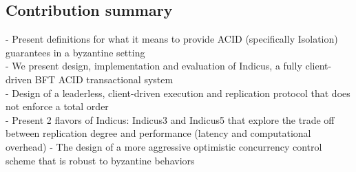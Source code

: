\subsection{Contribution summary}
 - Present definitions for what it means to provide ACID (specifically Isolation) guarantees in a byzantine setting\\
 - We present design, implementation and evaluation of Indicus, a fully client-driven BFT ACID transactional system \\
 - Design of a leaderless, client-driven execution and replication protocol that does not enforce a total order\\
 - Present 2 flavors of Indicus: Indicus3 and Indicus5 that explore the trade off between replication degree and performance (latency and computational overhead)
 - The design of a more aggressive optimistic concurrency control scheme that is robust to byzantine behaviors
 